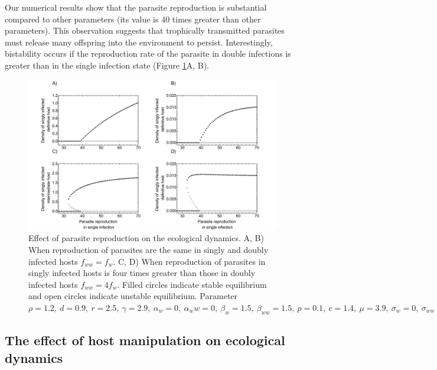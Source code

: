 \documentclass[11pt]{article}
\begin{document}
 
Our numerical results show that the parasite reproduction is substantial compared to other parameters (its value is 40 times greater than other parameters).
This observation suggests that trophically transmitted parasites must release many offspring into the environment to persist. 
Interestingly, bistability occurs if the reproduction rate of the parasite in double infections is greater than in the single infection state (Figure \ref{fig:bistability}A, B). 

\begin{figure}[!ht]
\includegraphics[width = \textwidth]{Figures/bistability.pdf}
\caption{Effect of parasite reproduction on the ecological dynamics. A, B) When reproduction of parasites are the same in singly and doubly infected hosts $f_{ww} = f_w$. C, D)  When reproduction of parasites in singly infected hosts is four times greater than those in doubly infected hosts $f_{ww} = 4 f_w$. Filled circles indicate stable equilibrium and open circles indicate unstable equilibrium. Parameter $\rho = 1.2, \  d = 0.9, \  r = 2.5, \ \gamma = 2.9, \ \alpha_w = 0, \ \alpha_ww =  0, \ \beta_w = 1.5, \ \beta_{ww} = 1.5, \ p = 0.1, \  c = 1.4, \ \mu = 3.9,  \ \sigma_w = 0, \ \sigma_{ww} = 0, \  q = 0.01, \ \delta = 0.9, \ k = 0.26$
}
\label{fig:bistability}
\end{figure}

\subsection*{The effect of host manipulation on ecological dynamics}
\end{document}
